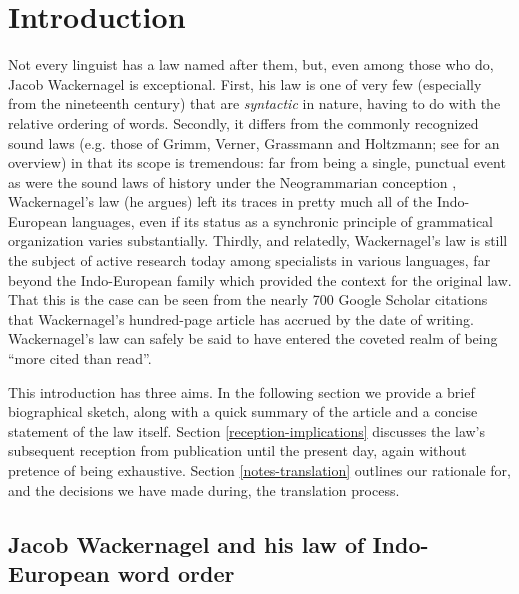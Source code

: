 \chapter{Introduction}
\author{George Walkden}

Not every linguist has a law named after them, but, even among those who do, Jacob Wackernagel is exceptional. First, his law is one of very few (especially from the nineteenth century) that are \emph{syntactic} in nature, having to do with the relative ordering of words. Secondly, it differs from the commonly recognized sound laws (e.g. those of Grimm, Verner, Grassmann and Holtzmann; see \citealp{Collinge1985} for an overview) in that its scope is tremendous: far from being a single, punctual event as were the sound laws of history under the Neogrammarian conception \citep{OsthoffBrugmann1878}, Wackernagel's law (he argues) left its traces in pretty much all of the Indo-European languages, even if its status as a synchronic principle of grammatical organization varies substantially. Thirdly, and relatedly, Wackernagel's law is still the subject of active research today among specialists in various languages, far beyond the Indo-European family which provided the context for the original law. That this is the case can be seen from the nearly 700 Google Scholar citations that Wackernagel's \citeyearpar{Wackernagel1892} hundred-page article has accrued by the date of writing. Wackernagel's law can safely be said to have entered the coveted realm of being ``more cited than read''.

This introduction has three aims. In the following section we provide a brief biographical sketch, along with a quick summary of the article and a concise statement of the law itself. Section \ref{reception-implications} discusses the law's subsequent reception from publication until the present day, again without pretence of being exhaustive. Section \ref{notes-translation} outlines our rationale for, and the decisions we have made during, the translation process.

\section{Jacob Wackernagel and his law of Indo-European word order}\label{intro-biography}

